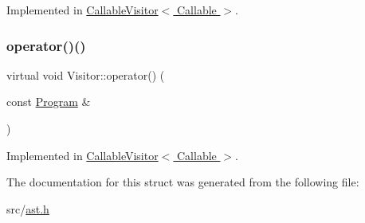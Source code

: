 Implemented in \hyperlink{struct_callable_visitor_aa70a97d5a44ecc30aac8fb97c12cabb6}{Callable\+Visitor$<$ Callable $>$}.

\mbox{\label{struct_visitor_a768e64f6e6fffb7440e3c1f1a78d9481}} 
\subsubsection{\texorpdfstring{operator()()}{operator()()}\hspace{0.1cm}{\footnotesize\ttfamily [45/45]}}
{\footnotesize\ttfamily virtual void Visitor\+::operator() (\begin{DoxyParamCaption}\item[{const \hyperlink{struct_program}{Program} \&}]{ }\end{DoxyParamCaption})\hspace{0.3cm}{\ttfamily [pure virtual]}}



Implemented in \hyperlink{struct_callable_visitor_a37e48e9df8cb4cff6bc135e7402a7244}{Callable\+Visitor$<$ Callable $>$}.



The documentation for this struct was generated from the following file\+:\begin{DoxyCompactItemize}
\item 
src/\hyperlink{ast_8h}{ast.\+h}\end{DoxyCompactItemize}
